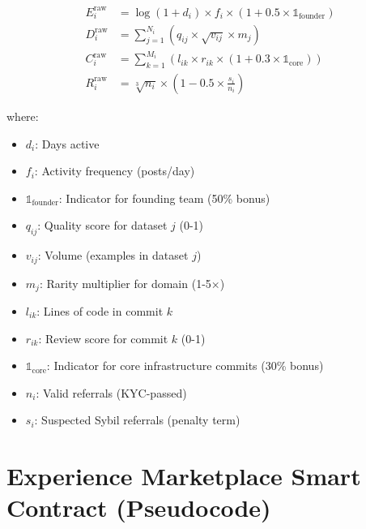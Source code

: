 \documentclass[11pt,letterpaper]{article}
\theoremstyle{definition}
\theoremstyle{remark}
\begin{document}
\begin{align}
E_i^{\text{raw}} &= \log(1 + d_i) \times f_i \times (1 + 0.5 \times \mathbb{1}_{\text{founder}}) \\
D_i^{\text{raw}} &= \sum_{j=1}^{N_i} \left( q_{ij} \times \sqrt{v_{ij}} \times m_j \right) \\
C_i^{\text{raw}} &= \sum_{k=1}^{M_i} \left( l_{ik} \times r_{ik} \times (1 + 0.3 \times \mathbb{1}_{\text{core}}) \right) \\
R_i^{\text{raw}} &= \sqrt[3]{n_i} \times \left( 1 - 0.5 \times \frac{s_i}{n_i} \right)
\end{align}

where:
\begin{itemize}
\item $d_i$: Days active
\item $f_i$: Activity frequency (posts/day)
\item $\mathbb{1}_{\text{founder}}$: Indicator for founding team (50\% bonus)
\item $q_{ij}$: Quality score for dataset $j$ (0-1)
\item $v_{ij}$: Volume (examples in dataset $j$)
\item $m_j$: Rarity multiplier for domain (1-5×)
\item $l_{ik}$: Lines of code in commit $k$
\item $r_{ik}$: Review score for commit $k$ (0-1)
\item $\mathbb{1}_{\text{core}}$: Indicator for core infrastructure commits (30\% bonus)
\item $n_i$: Valid referrals (KYC-passed)
\item $s_i$: Suspected Sybil referrals (penalty term)
\end{itemize}

\section{Experience Marketplace Smart Contract (Pseudocode)}
\end{document}

